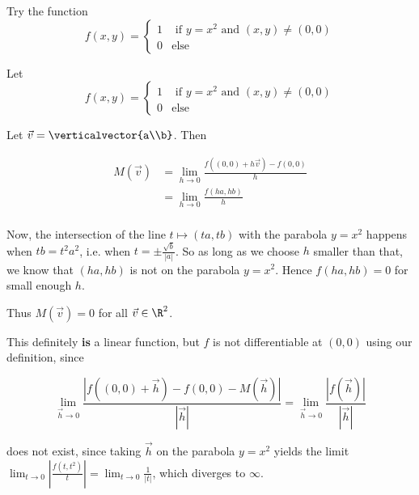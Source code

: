 \documentclass{ximera}
\begin{document}
	\begin{hint}
		Try the function \[f(x,y) = \begin{cases}
			1 & \text{ if $y=x^2$ and $(x,y) \neq (0,0)$}\\
			0 & \text{else}
		\end{cases}\]
	\end{hint}
	
	\begin{free-response}
	Let 
	\[f(x,y) = \begin{cases}
			1 & \text{ if $y=x^2$ and $(x,y) \neq (0,0)$}\\
			0 & \text{else}
		\end{cases}\]
		
	Let $\vec{v} = \verticalvector{a\\b}$.  Then 
	
	\begin{align*}
			M\left(\vec{v}\right) &= \lim_{h \to 0}\frac{f((0,0)+h\vec{v}) - f(0,0)}{h}\\
							&= \lim_{h \to 0}\frac{f(ha,hb)}{h}\\
		\end{align*}
		
		Now, the intersection of the line $t \mapsto (ta,tb)$ with the parabola $y=x^2$ happens when $tb = t^2a^2$, i.e. when $t = \pm \frac{\sqrt{b}}{|a|}$.  So as long as
		we choose $h$ smaller than that, we know that $(ha,hb)$ is not on the parabola $y=x^2$.  Hence $f(ha,hb) = 0$ for small enough $h$.
		
		Thus $M(\vec{v}) = 0$ for all $\vec{v}\in \R^2$.
		
		This definitely \textbf{is} a linear function, but $f$ is not differentiable at $(0,0)$ using our definition, since
		
		\[\displaystyle\lim_{\vec{h} \to 0} \frac{\left|f((0,0)+\vec{h}) - f(0,0) - M(\vec{h})\right|}{|\vec{h}|} =  \displaystyle\lim_{\vec{h} \to 0} \frac{\left|f(\vec{h})\right|}{|\vec{h}|} \] 
		
		does not exist, since taking $\vec{h}$ on the parabola $y=x^2$ yields the limit $\displaystyle\lim_{t \to 0} \left| \frac{f(t,t^2)}{t}\right| = \displaystyle\lim_{t \to 0} \frac{1}{|t|}$, which
		diverges to $\infty$. 
		
	\end{free-response}
\end{document}

